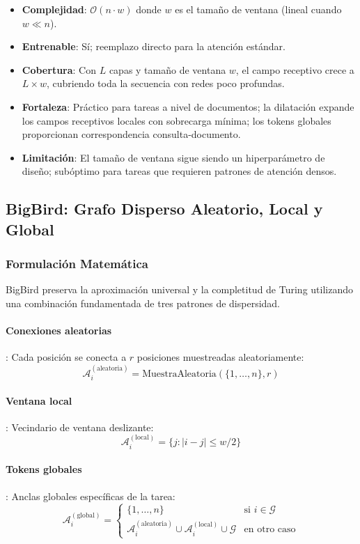 \begin{itemize}[leftmargin=*]
    \item \textbf{Complejidad}: $\mathcal{O}(n \cdot w)$ donde $w$ es el tamaño de ventana (lineal cuando $w \ll n$).
    \item \textbf{Entrenable}: Sí; reemplazo directo para la atención estándar.
    \item \textbf{Cobertura}: Con $L$ capas y tamaño de ventana $w$, el campo receptivo crece a $L \times w$, cubriendo toda la secuencia con redes poco profundas.
    \item \textbf{Fortaleza}: Práctico para tareas a nivel de documentos; la dilatación expande los campos receptivos locales con sobrecarga mínima; los tokens globales proporcionan correspondencia consulta-documento.
    \item \textbf{Limitación}: El tamaño de ventana sigue siendo un hiperparámetro de diseño; subóptimo para tareas que requieren patrones de atención densos.
\end{itemize}

\subsection{BigBird: Grafo Disperso Aleatorio, Local y Global}

\subsubsection{Formulación Matemática}

BigBird \citep{zaheer_bigbird_2020} preserva la aproximación universal y la completitud de Turing utilizando una combinación fundamentada de tres patrones de dispersidad.

\paragraph{Conexiones aleatorias}: Cada posición se conecta a $r$ posiciones muestreadas aleatoriamente:
\[
\mathcal{A}_i^{(\text{aleatoria})} = \text{MuestraAleatoria}(\{1, \ldots, n\}, r)
\]

\paragraph{Ventana local}: Vecindario de ventana deslizante:
\[
\mathcal{A}_i^{(\text{local})} = \{j : |i-j| \leq w/2\}
\]

\paragraph{Tokens globales}: Anclas globales específicas de la tarea:
\[
\mathcal{A}_i^{(\text{global})} = \begin{cases}
\{1, \ldots, n\} & \text{si } i \in \mathcal{G} \\
\mathcal{A}_i^{(\text{aleatoria})} \cup \mathcal{A}_i^{(\text{local})} \cup \mathcal{G} & \text{en otro caso}
\end{cases}
\]

